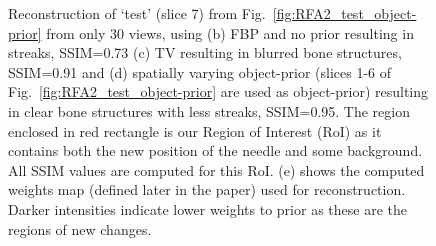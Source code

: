 \documentclass[journal]{IEEEtran}
\begin{document}
\begin{figure}[!h]
\centering
{}\hfill
{}\hfill
{}\hfill
{}
\caption{\small{ Reconstruction of `test' (slice 7) from Fig.~\ref{fig:RFA2_test_object-prior} from only 30 views, using (b) FBP and no prior resulting in streaks, SSIM=0.73 (c) TV resulting in blurred bone structures, SSIM=0.91 and (d) spatially varying object-prior (slices 1-6 of Fig.~\ref{fig:RFA2_test_object-prior} are used as object-prior) resulting in clear bone structures with less streaks, SSIM=0.95. The region enclosed in red rectangle is our Region of Interest (RoI) as it contains both the new position of the needle and some background. All SSIM values are computed for this RoI. (e) shows the computed weights map (defined later in the paper) used for reconstruction. Darker intensities indicate lower weights to prior as these are the regions of new changes.}}

\end{figure}
\end{document}
